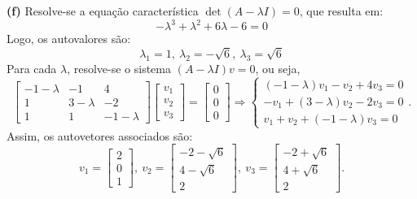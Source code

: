 \begin{resolution}
  {\bf (f)} \;
  Resolve-se a equação característica \( \det(A - \lambda I) = 0 \), que resulta em:
  \[
    -\lambda^3+\lambda^2+6\lambda-6=0
  \]
  Logo, os autovalores são:
  \[
    \lambda_1=1,\:\lambda_2=-\sqrt{6},\:\lambda_3=\sqrt{6}
  \]
  Para cada \(\lambda\), resolve-se o sistema \((A - \lambda I)v = 0\), ou seja,
  $$
    \begin{bmatrix}
      -1 - \lambda & -1 & 4 \\ 1 & 3 - \lambda & -2 \\ 1 & 1 & -1 - \lambda
    \end{bmatrix} \begin{bmatrix}
      v_1 \\ v_2 \\ v_3
    \end{bmatrix} = \begin{bmatrix}
      0 \\ 0 \\ 0
    \end{bmatrix} \Rightarrow
    \begin{cases}
      (-1 - \lambda) v_1 - v_2 + 4v_3 = 0 \\
      -v_1 + (3 - \lambda) v_2 - 2v_3 = 0 \\
      v_1 + v_2 + (-1 - \lambda) v_3 = 0
    \end{cases}.
  $$
  Assim, os autovetores associados são:
  \[
    v_1 = \begin{bmatrix}2\\ 0\\ 1\end{bmatrix},\:
    v_2 = \begin{bmatrix}-2-\sqrt{6}\\ 4-\sqrt{6}\\ 2\end{bmatrix},\:
    v_3 = \begin{bmatrix}-2+\sqrt{6}\\ 4+\sqrt{6}\\ 2\end{bmatrix}.
  \]


\end{resolution}
